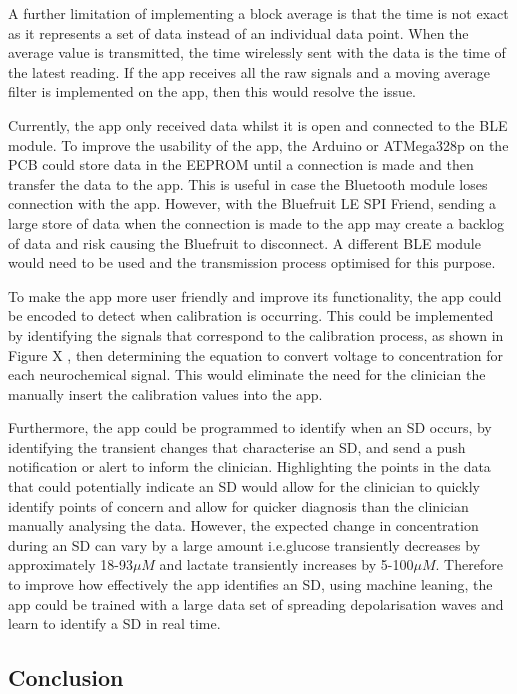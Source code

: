A further limitation of implementing a block average is that the time is not exact as it represents a set of data instead of an individual data point. When the average value is transmitted, the time wirelessly sent with the data is the time of the latest reading. If the app receives all the raw signals and a moving average filter is implemented on the app, then this would resolve the issue.

Currently, the app only received data whilst it is open and connected to the BLE module. To improve the usability of the app, the Arduino or ATMega328p on the PCB could store data in the EEPROM until a connection is made and then transfer the data to the app. This is useful in case the Bluetooth module loses connection with the app. However, with the Bluefruit LE SPI Friend, sending a large store of data when the connection is made to the app may create a backlog of data and risk causing the Bluefruit to disconnect. A different BLE module would need to be used and the transmission process optimised for this purpose.

To make the app more user friendly and improve its functionality, the app could be encoded to detect when calibration is occurring. This could be implemented by identifying the signals that correspond to the calibration process, as shown in Figure X %
, then determining the equation to convert voltage to concentration for each neurochemical signal. This would eliminate the need for the clinician the manually insert the calibration values into the app.

Furthermore, the app could be programmed to identify when an SD occurs, by identifying the transient changes that characterise an SD, and send a push notification or alert to inform the clinician. Highlighting the points in the data that could potentially indicate an SD would allow for the clinician to quickly identify points of concern and allow for quicker diagnosis than the clinician manually analysing the data. However, the expected change in concentration during an SD can vary by a large amount i.e.glucose transiently decreases by approximately 18-93$\mu M$ and lactate transiently increases by 5-100$\mu M$. Therefore to improve how effectively the app identifies an SD, using machine leaning, the app could be trained with a large data set of spreading depolarisation waves and learn to identify a SD in real time. 

\subsection{Conclusion}
